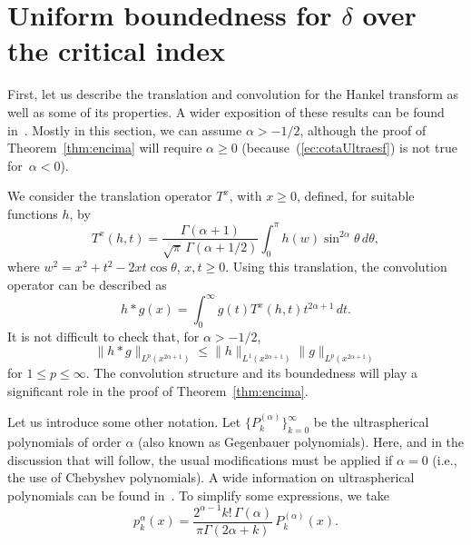 \documentclass{amsart}
\theoremstyle{remark}
\newcommand{\lpnorm}[2]{\|{#1}\|_{L^{#2}(x^{2\alpha+1})}}
\begin{document}
\section{Uniform boundedness for $\delta$ over the critical index}
\label{sec:encima}

First, let us describe the translation and convolution for the Hankel transform
as well as some of its properties. A wider exposition of these results can be
found in~\cite{Hir,Hai,Cho}. Mostly in this section, we can assume
$\alpha>-1/2$, although the proof of Theorem~\ref{thm:encima} will require
$\alpha \ge 0$ (because~(\ref{ec:cotaUltraesf}) is not true for~$\alpha<0$).

We consider the translation operator $T^x$, with
$x \ge 0$, defined, for suitable functions $h$, by
\begin{equation*}
    T^x(h,t) = \frac{\Gamma(\alpha+1)}{\sqrt{\pi}\,\Gamma(\alpha+1/2)}
      \int_0^{\pi} h(w)\sin^{2\alpha}{\theta} \, d\theta,
\end{equation*}
where $w^2 = x^2+t^2-2xt\cos\theta$, $x,t \ge 0$.
Using this translation, the convolution operator can be described as
\begin{equation}
\label{ec:convo}
    h*g(x) = \int_0^{\infty} g(t) T^x(h,t) t^{2\alpha+1} \, dt.
\end{equation}
It is not difficult to check that, for $\alpha>-1/2$,
\begin{equation}
\label{ec:acotconvo}
    \lpnorm{h*g}{p} \le \lpnorm{h}{1} \lpnorm{g}{p}
\end{equation}
for $1 \le p \le \infty$.
The convolution structure and its boundedness will play a significant role
in the proof of Theorem~\ref{thm:encima}.

Let us introduce some other notation.
Let $\{P^{(\alpha)}_k\}_{k=0}^\infty$ be the ultraspherical polynomials
of order $\alpha$ (also known as Gegenbauer polynomials). Here, and in the
discussion that will follow, the usual modifications must be applied if
$\alpha=0$ (i.e., the use of Chebyshev polynomials). A wide information on
ultraspherical polynomials can be found in~\cite{Sze}. To simplify some
expressions, we take
\begin{equation}
\label{ec:ultraesf}
    p^{\alpha}_k(x)
    = \frac{2^{\alpha-1}k!\,\Gamma(\alpha)}{\pi \Gamma(2\alpha+k)} \,
      P^{(\alpha)}_k(x).
\end{equation}
\end{document}
